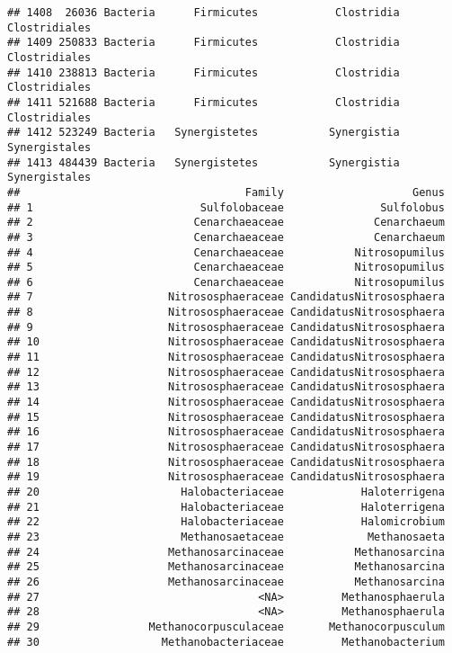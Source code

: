 \documentclass[
]{article}
\begin{document}
\begin{verbatim}
## 1408  26036 Bacteria      Firmicutes            Clostridia       Clostridiales
## 1409 250833 Bacteria      Firmicutes            Clostridia       Clostridiales
## 1410 238813 Bacteria      Firmicutes            Clostridia       Clostridiales
## 1411 521688 Bacteria      Firmicutes            Clostridia       Clostridiales
## 1412 523249 Bacteria   Synergistetes           Synergistia       Synergistales
## 1413 484439 Bacteria   Synergistetes           Synergistia       Synergistales
##                                   Family                    Genus
## 1                          Sulfolobaceae               Sulfolobus
## 2                         Cenarchaeaceae              Cenarchaeum
## 3                         Cenarchaeaceae              Cenarchaeum
## 4                         Cenarchaeaceae           Nitrosopumilus
## 5                         Cenarchaeaceae           Nitrosopumilus
## 6                         Cenarchaeaceae           Nitrosopumilus
## 7                     Nitrososphaeraceae CandidatusNitrososphaera
## 8                     Nitrososphaeraceae CandidatusNitrososphaera
## 9                     Nitrososphaeraceae CandidatusNitrososphaera
## 10                    Nitrososphaeraceae CandidatusNitrososphaera
## 11                    Nitrososphaeraceae CandidatusNitrososphaera
## 12                    Nitrososphaeraceae CandidatusNitrososphaera
## 13                    Nitrososphaeraceae CandidatusNitrososphaera
## 14                    Nitrososphaeraceae CandidatusNitrososphaera
## 15                    Nitrososphaeraceae CandidatusNitrososphaera
## 16                    Nitrososphaeraceae CandidatusNitrososphaera
## 17                    Nitrososphaeraceae CandidatusNitrososphaera
## 18                    Nitrososphaeraceae CandidatusNitrososphaera
## 19                    Nitrososphaeraceae CandidatusNitrososphaera
## 20                      Halobacteriaceae            Haloterrigena
## 21                      Halobacteriaceae            Haloterrigena
## 22                      Halobacteriaceae            Halomicrobium
## 23                      Methanosaetaceae             Methanosaeta
## 24                    Methanosarcinaceae           Methanosarcina
## 25                    Methanosarcinaceae           Methanosarcina
## 26                    Methanosarcinaceae           Methanosarcina
## 27                                  <NA>         Methanosphaerula
## 28                                  <NA>         Methanosphaerula
## 29                 Methanocorpusculaceae       Methanocorpusculum
## 30                   Methanobacteriaceae         Methanobacterium

\end{verbatim}
\end{document}
